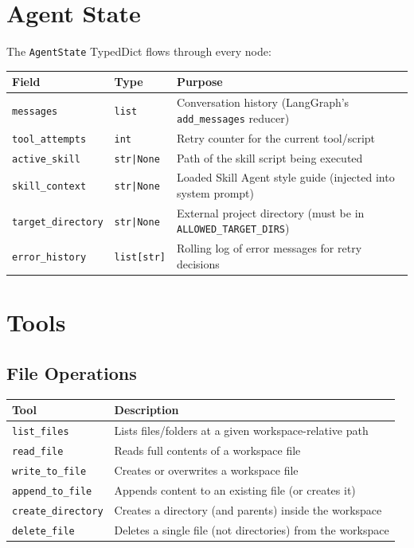 \documentclass[11pt,a4paper]{article}
\begin{document}
\section{Agent State}

The \texttt{AgentState} TypedDict flows through every node:

\begin{table}[h!]
\centering
\begin{tabular}{@{}llp{7cm}@{}}
\toprule
\textbf{Field} & \textbf{Type} & \textbf{Purpose} \\
\midrule
\texttt{messages} & \texttt{list} & Conversation history (LangGraph's \texttt{add\_messages} reducer) \\
\texttt{tool\_attempts} & \texttt{int} & Retry counter for the current tool/script \\
\texttt{active\_skill} & \texttt{str|None} & Path of the skill script being executed \\
\texttt{skill\_context} & \texttt{str|None} & Loaded Skill Agent style guide (injected into system prompt) \\
\texttt{target\_directory} & \texttt{str|None} & External project directory (must be in \texttt{ALLOWED\_TARGET\_DIRS}) \\
\texttt{error\_history} & \texttt{list[str]} & Rolling log of error messages for retry decisions \\
\bottomrule
\end{tabular}
\end{table}

\section{Tools}
\label{sec:tools}

\subsection{File Operations}

\begin{table}[h!]
\centering
\begin{tabular}{@{}lp{9cm}@{}}
\toprule
\textbf{Tool} & \textbf{Description} \\
\midrule
\texttt{list\_files} & Lists files/folders at a given workspace-relative path \\
\texttt{read\_file} & Reads full contents of a workspace file \\
\texttt{write\_to\_file} & Creates or overwrites a workspace file \\
\texttt{append\_to\_file} & Appends content to an existing file (or creates it) \\
\texttt{create\_directory} & Creates a directory (and parents) inside the workspace \\
\texttt{delete\_file} & Deletes a single file (not directories) from the workspace \\
\bottomrule
\end{tabular}
\end{table}
\end{document}
